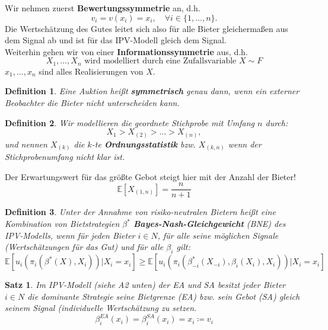 \documentclass[12pt]{extreport} %
\theoremstyle{named}
\theoremstyle{itshape}
\newtheorem{satz}[unnamedtheorem]{Satz}
\newtheorem*{definition}{Definition}
\theoremstyle{normal}
\begin{document}
	Wir nehmen zuerst \textbf{Bewertungssymmetrie} an, d.h.
	$$ v_{i} = v(x_{i}) = x_{i}, \quad \forall i \in \{1, \dotsc, n\}. $$
	Die Wertschätzung des Gutes leitet sich also für alle Bieter gleichermaßen aus dem Signal ab und ist für das IPV-Modell gleich dem Signal. \\
	
	Weiterhin gehen wir von einer \textbf{Informationssymmetrie} aus, d.h.
	$$ X_{1}, \dotsc, X_{n} \text{ wird modelliert durch eine Zufallsvariable } X \sim F $$
	$x_{1}, \dotsc, x_{n}$ sind alles Realisierungen von $X$.

 
\begin{definition}
	Eine Auktion heißt \textbf{symmetrisch} genau dann, wenn ein externer Beobachter die Bieter nicht unterscheiden kann.
\end{definition}

\begin{definition}
	Wir modellieren die geordnete Stichprobe mit Umfang $n$ durch:
		$$ X_{{1}} > X_{(2)} > \dotsc > X_{(n)}, $$
		und nennen $X_{(k)}$ die $k$-te \textbf{Ordnungsstatistik} bzw. $X_{(k, n)}$ wenn der Stichprobenumfang nicht klar ist.
\end{definition}

Der Erwartungswert für das größte Gebot steigt hier mit der Anzahl der Bieter!
	$$ \mathbb{E}[X_{(1,n)}] = \frac{n}{n+1} $$

\begin{definition}
	Unter der Annahme von risiko-neutralen Bietern heißt eine Kombination von Bietstrategien $\beta^{*}$ \textbf{Bayes-Nash-Gleichgewicht} (BNE) des IPV-Modells, wenn für jeden Bieter $i \in N$, für alle seine möglichen Signale (Wertschätzungen für das Gut) und für alle $\beta_{i}$ gilt:
	$$ \mathbb{E}\left[u_{i}\left(\pi_{i}\left(\beta^{*}(X), X_{i}\right) \right) \big| X_{i} = x_{i}\right] \geq \mathbb{E}\left[u_{i}\left(\pi_{i}\left(\beta_{-i}^{*}(X_{-i}), \beta_{i}(X_{i}), X_{i}\right) \right) \big| X_{i} = x_{i}\right] $$
\end{definition}


\begin{satz}
	Im IPV-Modell (siehe A2 unten) der EA und SA besitzt jeder Bieter $i \in N$ die dominante Strategie seine Bietgrenze (EA) bzw. sein Gebot (SA) gleich seinem Signal (individuelle Wertschätzung zu setzen.
	$$ \beta_{i}^{EA}(x_{i}) = \beta_{i}^{SA}(x_{i}) = x_{i} \coloneqq v_{i} $$
\end{satz}
\end{document}
